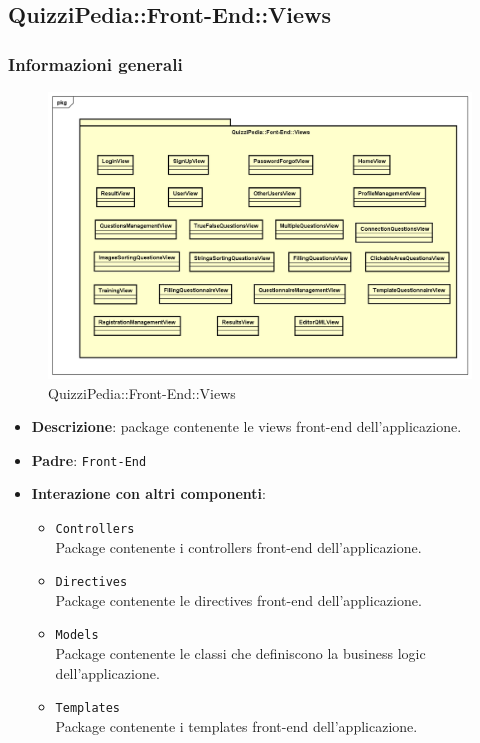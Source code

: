 \newpage

\subsection{QuizziPedia::Front-End::Views}
\subsubsection{Informazioni generali}
\label{QuizziPedia::Front-End}
\begin{figure}
	\centering
	\includegraphics[scale=0.45]{UML/Package/QuizziPedia_Front-End_View.png}
	\caption{QuizziPedia::Front-End::Views}
\end{figure}
\begin{itemize}
	\item \textbf{Descrizione}: package contenente le views front-end dell'applicazione.
	\item \textbf{Padre}: \texttt{Front-End}
	\item \textbf{Interazione con altri componenti}:
	\begin{itemize}
		\item \texttt{Controllers} \\ Package contenente i controllers front-end dell'applicazione.
		\item \texttt{Directives} \\ Package contenente le directives front-end dell'applicazione.
		\item \texttt{Models} \\ Package contenente le classi che definiscono la business logic dell'applicazione.
		\item \texttt{Templates} \\ Package contenente i templates front-end dell'applicazione.
	\end{itemize}
\end{itemize}
